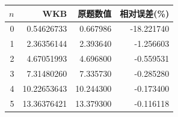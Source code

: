 \begin{center}\begin{tabular}{rrrr}\toprule $n$&WKB&原题数值&相对误差(\%)\\\midrule
0&0.54626733&0.667986&-18.221740\\
1&2.36356144&2.393640&-1.256603\\
2&4.67051993&4.696800&-0.559531\\
3&7.31480260&7.335730&-0.285280\\
4&10.22653643&10.244300&-0.173400\\
5&13.36376421&13.379300&-0.116118\\
\bottomrule\end{tabular}\end{center}
